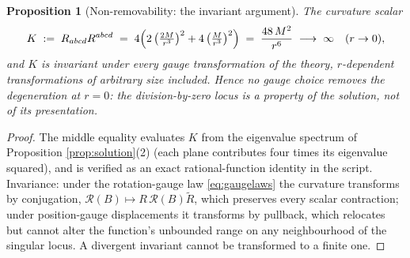 \documentclass[11pt]{article}
\newtheorem{proposition}[theorem]{Proposition}
\theoremstyle{definition}
\begin{document}
\begin{proposition}[Non-removability: the invariant argument]\label{prop:invariant}
The curvature scalar
\[
K \;:=\; R_{abcd}R^{abcd} \;=\; 4\Bigl(2\,\bigl(\tfrac{2M}{r^3}\bigr)^2 + 4\,\bigl(\tfrac{M}{r^3}\bigr)^2\Bigr) \;=\; \frac{48\,M^2}{r^6}
\;\longrightarrow\; \infty \quad (r \to 0),
\]
and $K$ is invariant under every gauge transformation of the theory, $r$-dependent transformations of arbitrary size included. Hence no gauge choice removes the degeneration at $r = 0$: the division-by-zero locus is a property of the solution, not of its presentation.
\end{proposition}

\begin{proof}
The middle equality evaluates $K$ from the eigenvalue spectrum of Proposition \ref{prop:solution}(2) (each plane contributes four times its eigenvalue squared), and is verified as an exact rational-function identity in the script. Invariance: under the rotation-gauge law \eqref{eq:gaugelaws} the curvature transforms by conjugation, $\mathcal{R}(B) \mapsto R\,\mathcal{R}(B)\tilde R$, which preserves every scalar contraction; under position-gauge displacements it transforms by pullback, which relocates but cannot alter the function's unbounded range on any neighbourhood of the singular locus. A divergent invariant cannot be transformed to a finite one.
\end{proof}
\end{document}
